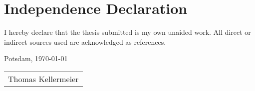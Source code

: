 \section*{Independence Declaration}

\thispagestyle{empty}

I hereby declare that the thesis submitted is my own unaided work. All direct or indirect sources used are acknowledged as references.\vspace{2 ex}

Potsdam, \today

\begin{flushleft}
    \begin{tabular}{p{5cm}}
        \hline
        \centering\footnotesize Thomas Kellermeier
    \end{tabular}
\end{flushleft}